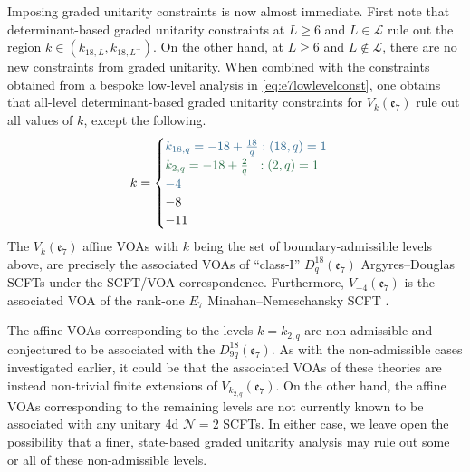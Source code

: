 Imposing graded unitarity constraints is now almost immediate. First note that determinant-based graded unitarity constraints at $L \geqslant 6$ and $L \in \mathcal{L}$ rule out the region $k \in (k_{18, L}, k_{18, L^-})$. On the other hand, at $L \geqslant 6$ and $L \notin \mathcal{L}$, there are no new constraints from graded unitarity. When combined with the constraints obtained from a bespoke low-level analysis in \eqref{eq:e7lowlevelconst}, one obtains that all-level determinant-based graded unitarity constraints for $V_k(\mathfrak{e}_7)$ rule out all values of $k$, except the following.
\begin{equation} \label{eq:e7alllevel}
    k = \begin{cases}
        \textcolor{knownSCFTtext}{k_{18,q} = -18 + \frac{18}{q}: (18,q) = 1} \\
        \textcolor{conjecturedSCFTtext}{k_{2,q} = -18 + \frac{2}{q} \ \ : (2,q) = 1} \\
        \textcolor{knownSCFTtext}{-4} \\
         -8 \\
          -11
    \end{cases}
\end{equation}
The $V_k(\mathfrak{e}_7)$ affine VOAs with $k$ being the set of boundary-admissible levels above, are precisely the associated VOAs of ``class-I'' $D_q^{18}(\mathfrak{e}_7)$ Argyres--Douglas SCFTs under the SCFT/VOA correspondence. Furthermore, $V_{-4}(\mathfrak{e}_7)$ is the associated VOA of the rank-one $E_7$ Minahan--Nemeschansky SCFT \cite{Minahan:1996cj}. 

The affine VOAs corresponding to the levels $k = k_{2,q}$ are non-admissible and conjectured to be associated with the $D_{9q}^{18}(\mathfrak{e}_7)$. As with the non-admissible cases investigated earlier, it could be that the associated VOAs of these theories are instead non-trivial finite extensions of $V_{k_{2,q}}(\mathfrak{e}_7)$. On the other hand, the affine VOAs corresponding to the remaining levels are not currently known to be associated with any unitary 4d $\mathcal{N} = 2$ SCFTs. In either case, we leave open the possibility that a finer, state-based graded unitarity analysis may rule out some or all of these non-admissible levels. 

